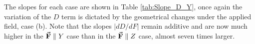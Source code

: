 \documentclass[12pt]{report}
\numberwithin{equation}{section}
\begin{document}

The slopes for each case are shown in Table \ref{tab:Slope_D_Y}, once again the variation of the $D$ term is dictated by the geometrical changes under the applied field, case (b).
Note that the slopes $|dD/dF|$ remain additive and are now much higher in the $\vec{\vb{F}}\parallel Y$ case than in the $\vec{\vb{F}}\parallel Z$ case, almost seven times larger.
\begin{table}[!ht]
    \centering
    \caption{Slopes of the straight lines in cases (a), (b) and (c) for the D and E parameter for $\vec{\vb{F}}\parallel Y$}
    \label{tab:Slope_D_Y}
\end{table}
\end{document}
